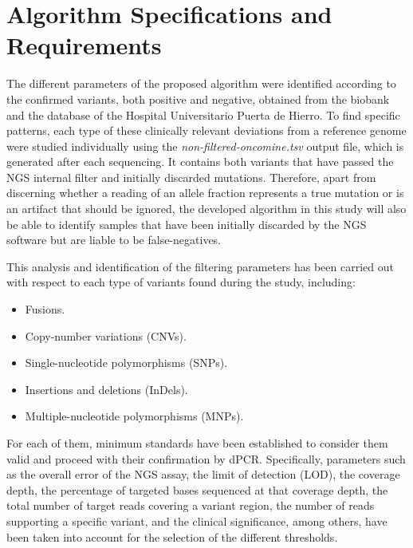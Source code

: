 \section{Algorithm Specifications and Requirements}


The different parameters of the proposed algorithm were identified according to the confirmed variants, both positive and negative, obtained from the biobank and the database of the Hospital Universitario Puerta de Hierro. To find specific patterns, each type of these clinically relevant deviations from a reference genome were studied individually using the \textit{non-filtered-oncomine.tsv} output file, which is generated after each sequencing. It contains both variants that have passed the NGS internal filter and initially discarded mutations. Therefore, apart from discerning whether a reading of an allele fraction represents a true mutation or is an artifact that should be ignored, the developed algorithm in this study will also be able to identify samples that have been initially discarded by the NGS software but are liable to be false-negatives.

This analysis and identification of the filtering parameters has been carried out with respect to each type of variants found during the study, including:
\begin{itemize}
    \item Fusions.
    \item Copy-number variations (CNVs).
    \item Single-nucleotide polymorphisms (SNPs).
    \item Insertions and deletions (InDels).
    \item Multiple-nucleotide polymorphisms (MNPs).
\end{itemize}

For each of them, minimum standards have been established to consider them valid and proceed with their confirmation by dPCR. Specifically, parameters such as the overall error of the NGS assay, the limit of detection (LOD), the coverage depth, the percentage of targeted bases sequenced at that coverage depth, the total number of target reads covering a variant region, the number of reads supporting a specific variant, and the clinical significance, among others, have been taken into account for the selection of the different thresholds.

